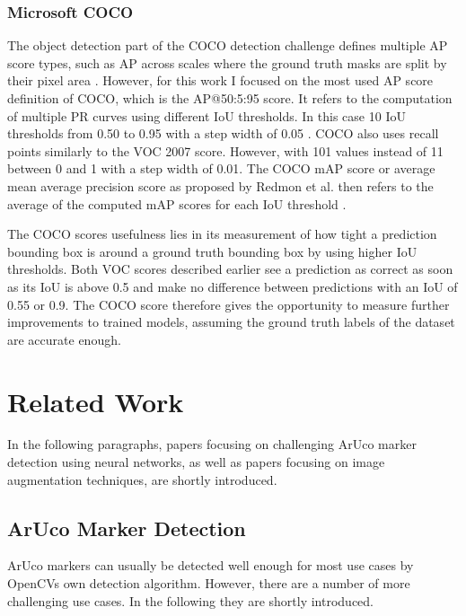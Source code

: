 \documentclass[10pt]{book}
\begin{document}
\subsection{Microsoft COCO}

The object detection part of the \ac{COCO} detection challenge defines multiple AP score types, such as AP across scales where the ground truth masks are split by their pixel area \cite{padilla2020survey}. However, for this work I focused on the most used AP score definition of \ac{COCO}, which is the AP@50:5:95 score. It refers to the computation of multiple \acp{PR curve} using different \ac{IoU} thresholds. In this case 10 \ac{IoU} thresholds from 0.50 to 0.95 with a step width of 0.05 \cite{terven2023comprehensive}. \ac{COCO} also uses recall points similarly to the VOC 2007 score. However, with 101 values instead of 11 between 0 and 1 with a step width of 0.01. %
The \ac{COCO} mAP score or average mean average precision score as proposed by Redmon et al. then refers to the average of the computed mAP scores for each \ac{IoU} threshold \cite{redmon2018yolov3}. 

The \ac{COCO} scores usefulness lies in its measurement of how tight a prediction bounding box is around a ground truth bounding box by using higher \ac{IoU} thresholds. Both VOC scores described earlier see a prediction as correct as soon as its \ac{IoU} is above 0.5 and make no difference between predictions with an \ac{IoU} of 0.55 or 0.9. The \ac{COCO} score therefore gives the opportunity to measure further improvements to trained models, assuming the ground truth labels of the dataset are accurate enough.

\chapter{Related Work}
\label{chap:relatedw}

In the following paragraphs, papers focusing on challenging \ac{ArUco} marker detection using neural networks, as well as papers focusing on image augmentation techniques, are shortly introduced.

\section{ArUco Marker Detection}

\ac{ArUco} markers can usually be detected well enough for most use cases by \acp{OpenCV} own detection algorithm. However, there are a number of more challenging use cases. In the following they are shortly introduced.
\end{document}
